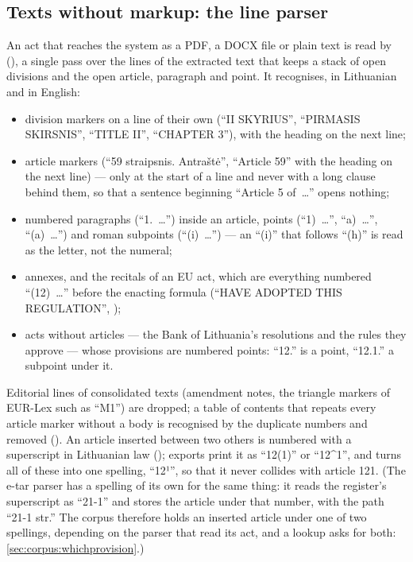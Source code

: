 \subsection{Texts without markup: the line parser}\label{sec:corpus:line}

An act that reaches the system as a PDF, a DOCX file or plain text is read by
 (), a single pass over the lines of the
extracted text that keeps a stack of open divisions and the open article, paragraph and
point. It recognises, in Lithuanian and in English:

\begin{itemize}
  \item division markers on a line of their own (\enquote{II SKYRIUS}, \enquote{PIRMASIS
    SKIRSNIS}, \enquote{TITLE II}, \enquote{CHAPTER 3}), with the heading on the next line;
  \item article markers (\enquote{59 straipsnis. Antraštė}, \enquote{Article 59} with the
    heading on the next line) --- only at the start of a line and never with a long clause
    behind them, so that a sentence beginning \enquote{Article 5 of~…} opens nothing;
  \item numbered paragraphs (\enquote{1.~…}) inside an article, points (\enquote{1)~…},
    \enquote{a)~…}, \enquote{(a)~…}) and roman subpoints (\enquote{(i)~…}) --- an
    \enquote{(i)} that follows \enquote{(h)} is read as the letter, not the numeral;
  \item annexes, and the recitals of an EU act, which are everything numbered
    \enquote{(12)~…} before the enacting formula (\enquote{HAVE ADOPTED THIS REGULATION},
    );
  \item acts without articles --- the Bank of Lithuania's resolutions and the rules they
    approve --- whose provisions are numbered points: \enquote{12.} is a point, \enquote{12.1.}
    a subpoint under it.
\end{itemize}

Editorial lines of consolidated texts (amendment notes, the triangle markers of EUR-Lex such as
\enquote{M1}) are dropped; a table
of contents that repeats every article marker without a body is recognised by the duplicate
numbers and removed (). An article inserted between two others is
numbered with a superscript in Lithuanian law (); exports print it as
\enquote{12(1)} or \enquote{12\textasciicircum 1}, and  turns all of
these into one spelling, \enquote{12¹}, so that it never collides with article 121. (The
e-tar parser has a spelling of its own for the same thing: it reads the register's
superscript as \enquote{21-1} and stores the article under that number, with the path
\enquote{21-1 str.} The corpus therefore holds an inserted article under one of two
spellings, depending on the parser that read its act, and a lookup asks for both:
\cref{sec:corpus:whichprovision}.)

